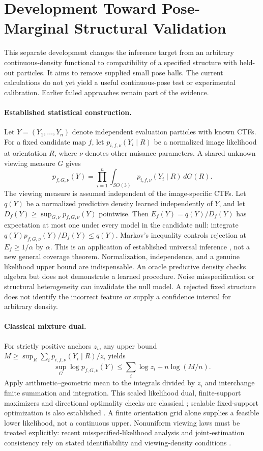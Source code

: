 \section{Development Toward Pose-Marginal Structural Validation}
\label{sec:mixturedevelopment}
This separate development changes the inference target from an arbitrary
continuous-density functional to compatibility of a specified structure with
held-out particles. It aims to remove supplied small pose balls. The current
calculations do not yet yield a useful continuous-pose test or experimental
calibration. Earlier failed approaches remain part of the evidence.

\paragraph{Established statistical construction.}
Let $Y=(Y_1,\ldots,Y_n)$ denote independent evaluation particles with known CTFs.
For a fixed candidate map $f$, let $p_{i,f,\nu}(Y_i\mid R)$ be a normalized
image likelihood at orientation $R$, where $\nu$ denotes other nuisance
parameters. A shared unknown viewing measure $G$ gives
\[
 p_{f,G,\nu}(Y)=\prod_{i=1}^n\int_{SO(3)}p_{i,f,\nu}(Y_i\mid R)\,dG(R).
\]
The viewing measure is assumed independent of the image-specific CTFs.
Let $q(Y)$ be a normalized predictive density learned independently of $Y$,
and let $D_f(Y)\ge\sup_{G,\nu}p_{f,G,\nu}(Y)$ pointwise. Then
$E_f(Y)=q(Y)/D_f(Y)$ has expectation at most one under every model in the
candidate null: integrate $q(Y)p_{f,G,\nu}(Y)/D_f(Y)\le q(Y)$.
Markov's inequality controls rejection at $E_f\ge1/\alpha$ by $\alpha$.
This is an application of established universal inference
\citep{universal2020}, not a new general coverage theorem. Normalization,
independence, and a genuine likelihood upper bound are indispensable.
An oracle predictive density checks algebra but does not demonstrate a learned
procedure. Noise misspecification or structural heterogeneity can invalidate
the null model. A rejected fixed structure does not identify the incorrect
feature or supply a confidence interval for arbitrary density.

\paragraph{Classical mixture dual.}
For strictly positive anchors $z_i$, any upper bound
$M\ge\sup_R\sum_i p_{i,f,\nu}(Y_i\mid R)/z_i$ yields
\begin{equation}\label{eq:mixturedual}
 \sup_G\log p_{f,G,\nu}(Y)
 \le \sum_i\log z_i+n\log(M/n).
\end{equation}
Apply arithmetic--geometric mean to the integrals divided by $z_i$ and
interchange finite summation and integration. This scaled likelihood dual,
finite-support maximizers and directional optimality checks are classical
\citep{lindsay1983}; scalable fixed-support optimization is also established
\citep{npmle2024}. A finite orientation grid alone supplies a feasible lower
likelihood, not a continuous upper. Nonuniform viewing laws must be treated
explicitly: recent misspecified-likelihood analysis and joint-estimation
consistency rely on stated identifiability and viewing-density conditions
\citep{nonuniformmle2025}.

